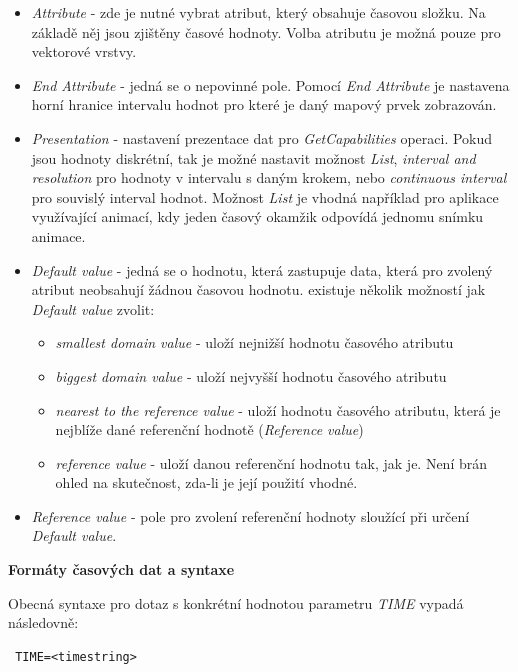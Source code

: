 \begin{itemize}
	\item \textit{Attribute} - zde je nutné vybrat atribut, který
obsahuje časovou složku. Na základě něj jsou zjištěny časové
hodnoty. Volba atributu je možná pouze pro vektorové vrstvy.
	\item \textit{End Attribute} - jedná se o nepovinné
pole. Pomocí \textit{End Attribute} je nastavena horní hranice
intervalu hodnot pro které je daný mapový prvek zobrazován.
	\item \textit{Presentation} - nastavení prezentace dat pro
\textit{GetCapabilities} operaci. Pokud jsou hodnoty diskrétní, tak je
možné nastavit možnost \textit{List}, \textit{interval and resolution}
pro hodnoty v intervalu s daným krokem, nebo \textit{continuous
interval} pro souvislý interval hodnot. Možnost \textit{List} je
vhodná například pro aplikace využívající animací, kdy jeden časový
okamžik odpovídá jednomu snímku animace.
	\item \textit{Default value} - jedná se o hodnotu, která
zastupuje data, která pro zvolený atribut neobsahují žádnou časovou
hodnotu. existuje několik možností jak \textit{Default value} zvolit:
	\begin{itemize}
		\item \textit{smallest domain value} - uloží nejnižší
hodnotu časového atributu
		\item \textit{biggest domain value} - uloží nejvyšší
hodnotu časového atributu
		\item \textit{nearest to the reference value} - uloží
hodnotu časového atributu, která je nejblíže dané referenční hodnotě
(\textit{Reference value})
		\item \textit{reference value} - uloží danou
referenční hodnotu tak, jak je. Není brán ohled na skutečnost, zda-li je její použití vhodné.
	\end{itemize}
	\item \textit{Reference value} - pole pro zvolení referenční
hodnoty sloužící při určení \textit{Default value}.
\end{itemize}

\bigskip
\noindent \textbf{Formáty časových dat a syntaxe}

\noindent Obecná syntaxe pro dotaz s konkrétní hodnotou parametru
\textit{TIME} vypadá následovně:

\begin{verbatim} TIME=<timestring>
\end{verbatim}

